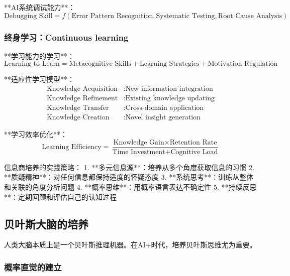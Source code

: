 **AI系统调试能力**：
\begin{equation}
\text{Debugging Skill} = f(\text{Error Pattern Recognition}, \text{Systematic Testing}, \text{Root Cause Analysis})
\end{equation}

\subsubsection{终身学习：Continuous learning} %

**学习能力的学习**：
\begin{equation}
\text{Learning to Learn} = \text{Metacognitive Skills} + \text{Learning Strategies} + \text{Motivation Regulation}
\end{equation}

**适应性学习模型**：
\begin{align}
\text{Knowledge Acquisition} &: \text{New information integration} \\
\text{Knowledge Refinement} &: \text{Existing knowledge updating} \\
\text{Knowledge Transfer} &: \text{Cross-domain application} \\
\text{Knowledge Creation} &: \text{Novel insight generation}
\end{align}

**学习效率优化**：
\begin{equation}
\text{Learning Efficiency} = \frac{\text{Knowledge Gain} \times \text{Retention Rate}}{\text{Time Investment} + \text{Cognitive Load}}
\end{equation}

\begin{center}
信息商培养的实践策略：
1. **多元信息源**：培养从多个角度获取信息的习惯
2. **质疑精神**：对任何信息都保持适度的怀疑态度
3. **系统思考**：训练从整体和关联的角度分析问题
4. **概率思维**：用概率语言表达不确定性
5. **持续反思**：定期回顾和评估自己的认知过程
\end{center}

\subsection{贝叶斯大脑的培养}

人类大脑本质上是一个贝叶斯推理机器。在AI+时代，培养贝叶斯思维尤为重要。

\subsubsection{概率直觉的建立} %

